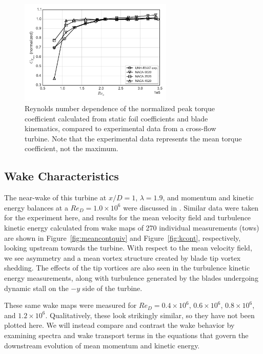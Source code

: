\documentclass[energies,article,accept,moreauthors,pdftex,12pt,a4paper]{mdpi}
\begin{document}
\begin{figure}[ht!]
\centering

\includegraphics[width=0.65\textwidth]{figures/cft_re_dep_foils}

\caption{Reynolds number dependence of the normalized peak torque coefficient
    calculated from static foil coefficients and blade kinematics, compared to
    experimental data from a cross-flow turbine. Note that the experimental data
    represents the mean torque coefficient, not the maximum.}

\label{fig:foils-C_T-Re-dep}
\end{figure}


\subsection{Wake Characteristics}

The near-wake of this turbine at $x/D=1$, $\lambda=1.9$, and momentum and
kinetic energy balances at a $Re_D = 1.0 \times 10^6$ were discussed in
\cite{Bachant2015-JoT}. Similar data were taken for the experiment here, and
results for the mean velocity field and turbulence kinetic energy calculated
from wake maps of 270 individual measurements (tows) are shown in
Figure~\ref{fig:meancontquiv} and Figure~\ref{fig:kcont}, respectively, looking
upstream towards the turbine. With respect to the mean velocity field, we see
asymmetry and a mean vortex structure created by blade tip vortex shedding. The
effects of the tip vortices are also seen in the turbulence kinetic energy
measurements, along with turbulence generated by the blades undergoing dynamic
stall on the $-y$ side of the turbine.

These same wake maps were measured for $Re_D = 0.4 \times 10^6$, $0.6 \times
10^6$, $0.8 \times 10^6$, and $1.2 \times 10^6$. Qualitatively, these look
strikingly similar, so they have not been plotted here. We will instead compare
and contrast the wake behavior by examining spectra and wake transport terms in
the equations that govern the downstream evolution of mean momentum and kinetic
energy.
\end{document}
